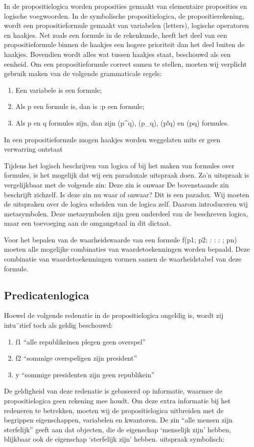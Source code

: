 \documentclass{article}
\begin{document}
	In de propositielogica worden proposities gemaakt van elementaire proposities en logische
	voegwoorden. In de symbolische propositielogica, de propositierekening, wordt een
	propositieformule gemaakt van variabelen (letters), logische operatoren en haakjes. Net
	zoals een formule in de rekenkunde, heeft het deel van een propositieformule binnen de
	haakjes een hogere prioriteit dan het deel buiten de haakjes. Bovendien wordt alles wat
	tussen haakjes staat, beschouwd als een eenheid. Om een propositieformule correct samen
	te stellen, moeten wij verplicht gebruik maken van de volgende grammaticale regels:
	\begin{enumerate}
		\item Een variabele is een formule;
		\item Als p een formule is, dan is :p een formule;
		\item Als p en q formules zijn, dan zijn (p^q), (p_q), (p!q) en (p\text{$}q) formules.
	\end{enumerate}
	
	In een propositieformule mogen haakjes worden weggelaten mits er geen verwarring ontstaat
	
	Tijdens het logisch beschrijven van logica of bij het maken van formules over formules, is
	het mogelijk dat wij een paradoxale uitspraak doen. Zo’n uitspraak is vergelijkbaar met
	de volgende zin:
	Deze zin is onwaar
	De bovenstaande zin beschrijft zichzelf. Is deze zin nu waar of onwaar? Dit is een paradox.
	Wij moeten de uitspraken over de logica scheiden van de logica zelf. Daarom introduceren
	wij metasymbolen. Deze metasymbolen zijn geen onderdeel van de beschreven logica,
	maar een toevoeging aan de omgangstaal in dit dictaat.
	
	Voor het bepalen van de waarheidswaarde van een formule f(p1; p2; : : : ; pn) moeten alle
	mogelijke combinaties van waardetoekenningen worden bepaald. Deze combinatie van
	waardetoekenningen vormen samen de waarheidstabel van deze formule.
	
	
	\subsection{Predicatenlogica}
	
	Hoewel de volgende redenatie in de propositielogica ongeldig is, wordt zij intu¨ıtief toch
	als geldig beschouwd:
	\begin{enumerate}
		\item f1 “alle republikeinen plegen geen overspel”
		\item f2 “sommige overspeligen zijn president”
		\item y “sommige presidenten zijn geen republikein”
	\end{enumerate}
	De geldigheid van deze redenatie is gebaseerd op informatie, waarmee de propositielogica
	geen rekening mee houdt. Om deze extra informatie bij het redeneren te betrekken,
	moeten wij de propositielogica uitbreiden met de begrippen eigenschappen, variabelen en
	kwantoren. De zin “alle mensen zijn sterfelijk” geeft aan dat objecten, die de eigenschap
	‘menselijk zijn’ hebben, blijkbaar ook de eigenschap ‘sterfelijk zijn’ hebben.
	uitspraak symbolisch:
	
\end{document}
